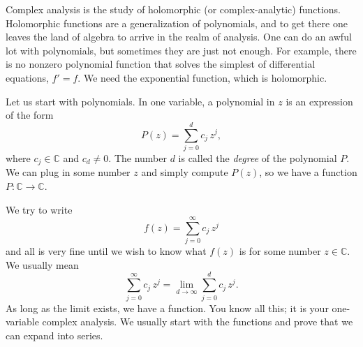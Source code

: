 \documentclass[12pt,openany]{book}
\newcommand{\C}{{\mathbb{C}}}
\theoremstyle{plain}
\theoremstyle{remark}
\theoremstyle{definition}
\theoremstyle{exercise}
\theoremstyle{example}
\begin{document}
\medskip

Complex analysis is the study of holomorphic (or complex-analytic)
functions.
Holomorphic functions are a generalization of polynomials,
and to get there one leaves the land of algebra to arrive in the realm of
analysis.
One can do an awful lot with polynomials, but sometimes they are
just not enough.  For example, there is no nonzero polynomial function that solves
the simplest of differential equations, $f' = f$.  We need the exponential
function, which is holomorphic.  

Let us start with polynomials.  In one variable, a polynomial in $z$ is
an expression of the form
\begin{equation*}
P(z) = \sum_{j=0}^d c_j \, z^j ,
\end{equation*}
where $c_j \in \C$ and $c_d \not= 0$.  The number $d$ is called the
\emph{degree}
of the
polynomial $P$.  We can plug in some number $z$ and simply compute
$P(z)$, so we have a function $P \colon \C \to \C$.

We try to write
\begin{equation*}
f(z) = \sum_{j=0}^\infty c_j \, z^j
\end{equation*}
and all is very fine until we wish to know what $f(z)$ is for some number
$z \in \C$.
We usually mean 
\begin{equation*}
\sum_{j=0}^\infty c_j \, z^j
=
\lim_{d\to\infty}
\sum_{j=0}^d c_j \, z^j .
\end{equation*}
As long as the limit exists, we have a function.  You know all
this; it is your one-variable complex analysis.  We usually
start with the functions and prove that we can expand into series.
\end{document}
